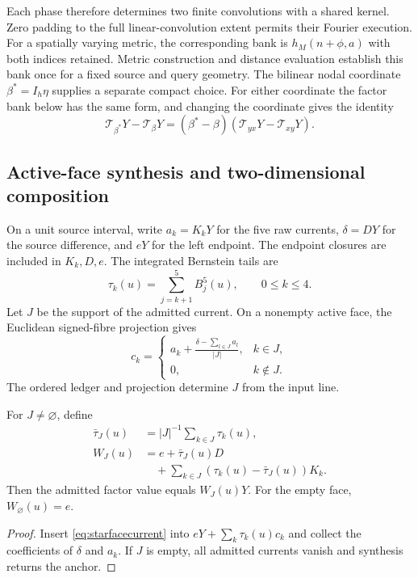 Each phase therefore determines two finite convolutions with a shared kernel.
Zero padding to the full linear-convolution extent permits their Fourier
execution. For a spatially varying metric, the corresponding bank is
$h_M(n+\phi,a)$ with both indices retained. Metric construction and distance
evaluation establish this bank once for a fixed source and query geometry.
The bilinear nodal coordinate $\beta^*=I_h\eta$ supplies a separate compact
choice. For either coordinate the factor bank below has the same form, and
changing the coordinate gives the identity
\begin{equation}
 \mathcal T_{\beta^*}Y-\mathcal T_\beta Y
 =(\beta^*-\beta)(\mathcal T_{yx}Y-\mathcal T_{xy}Y).
\end{equation}

\subsection{Active-face synthesis and two-dimensional composition}
On a unit source interval, write $a_k=K_kY$ for the five raw currents,
$\delta=DY$ for the source difference, and $eY$ for the left endpoint.
The endpoint closures are included in $K_k,D,e$. The integrated Bernstein
tails are
\begin{equation}
 \tau_k(u)=\sum_{j=k+1}^{5}B_j^5(u),\qquad 0\leq k\leq4.
\end{equation}
Let $J$ be the support of the admitted current. On a nonempty active face,
the Euclidean signed-fibre projection gives
\begin{equation}
 c_k=\begin{cases}
 a_k+\displaystyle\frac{\delta-\sum_{l\in J}a_l}{|J|},&k\in J,\\
 0,&k\notin J.
 \end{cases}
 \label{eq:starfacecurrent}
\end{equation}
The ordered ledger and projection determine $J$ from the input line.

\begin{proposition}
For $J\ne\varnothing$, define
\begin{align}
 \bar\tau_J(u)&=|J|^{-1}\sum_{k\in J}\tau_k(u),\nonumber\\
 W_J(u)&=e+\bar\tau_J(u)D\nonumber\\
 &\quad+\sum_{k\in J}(\tau_k(u)-\bar\tau_J(u))K_k.
 \label{eq:starfacefir}
\end{align}
Then the admitted factor value equals $W_J(u)Y$. For the empty face,
$W_\varnothing(u)=e$.
\end{proposition}
\begin{proof}
Insert \eqref{eq:starfacecurrent} into $eY+\sum_k\tau_k(u)c_k$ and collect
the coefficients of $\delta$ and $a_k$. If $J$ is empty, all admitted
currents vanish and synthesis returns the anchor.
\end{proof}

